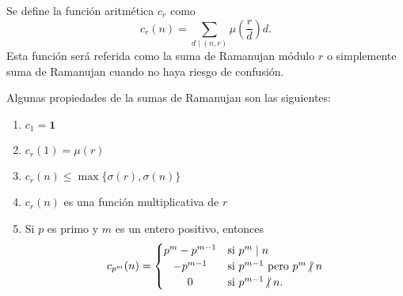 \begin{definition}
Se define la función aritmética $c_r$ como
\begin{equation}\label{eq:ram0}
    c_r(n) = \sum_{d \mid (n,r)} \mu \left( \frac{r}{d} \right) d.
\end{equation}
Esta función será referida como la suma de Ramanujan módulo $r$ o simplemente suma de Ramanujan cuando no haya riesgo de confusión.
\end{definition}

\begin{proposition}
Algunas propiedades de la sumas de Ramanujan son las siguientes:
\begin{enumerate}[label=\textnormal{(\arabic*)},ref=\textnormal{\arabic*}]
\item $c_1 = \mathbf{1}$
\item $c_r(1) = \mu(r)$
\item $c_r(n) \le \max \{ \sigma(r), \sigma(n) \}$
\item \label{it:ram1} $c_r(n)$ es una función multiplicativa de $r$
\item Si $p$ es primo y $m$ es un entero positivo, entonces
    \begin{equation*}
        c_{p^m}(n) = \begin{cases}
            \hfil p^m - p^{m-1} & \text{si } p^m \mid n \\
            \hfil -p^{m-1} & \text{si } p^{m-1} \text{ pero } p^m \centernot\mid n \\
            \hfil 0 & \text{si } p^{m-1} \centernot\mid n.
        \end{cases}
    \end{equation*}
\end{enumerate}
\end{proposition}

